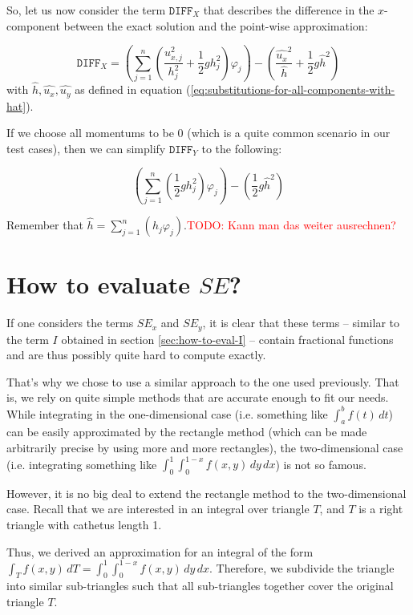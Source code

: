 \documentclass{article}
\newcommand{\todo}[1]{\textcolor{red}{TODO: #1}}
\renewcommand{\phi}{\varphi}
\begin{document}
So, let us now consider the term $\mathtt{DIFF}_X$ that describes the difference in the $x$-component between the exact solution and the point-wise approximation:

\begin{equation*}
  \mathtt{DIFF}_X = \left( \sum_{j=1}^n \left(\frac{u_{x,j}^2}{h_j^2} + \frac{1}{2} g h_j^2\right) \phi_j \right) - \left( \frac{\widehat{u_x}^2}{\widehat h} + \frac{1}{2} g \widehat{h}^2\right)
\end{equation*}
with $\widehat h, \widehat{u_x}, \widehat{u_y}$ as defined in equation (\ref{eq:substitutions-for-all-components-with-hat}).

If we choose all momentums to be 0 (which is a quite common scenario in our test cases), then we can simplify $\mathtt{DIFF}_Y$ to the following:

\begin{equation*}
  \left( \sum_{j=1}^n \left(\frac{1}{2} g h_j^2\right) \phi_j \right) - \left( \frac{1}{2} g \widehat{h}^2\right)
\end{equation*}

Remember that $\widehat{h}=\sum_{j=1}^n \left(h_j \phi_j\right)$.\todo{Kann man das weiter ausrechnen?}

\section{How to evaluate $SE$?}
\label{sec:how-to-evaluate-e}

If one considers the terms $SE_x$ and $SE_y$, it is clear that these terms -- similar to the term $I$ obtained in section \ref{sec:how-to-eval-I} -- contain fractional functions and are thus possibly quite hard to compute exactly.

That's why we chose to use a similar approach to the one used previously. That is, we rely on quite simple methods that are accurate enough to fit our needs. While integrating in the one-dimensional case (i.e. something like $\int_a^b f(t)\,dt$) can be easily approximated by the rectangle method (which can be made arbitrarily precise by using more and more rectangles), the two-dimensional case (i.e. integrating something like $\int_{0}^1 \int_0^{1-x} f(x,y)\, dy\, dx$) is not so famous.

However, it is no big deal to extend the rectangle method to the two-dimensional case. Recall that we are interested in an integral over triangle $T$, and $T$ is a right triangle with cathetus length 1.

Thus, we derived an approximation for an integral of the form $\int_T f(x,y)\, dT = \int_{0}^1 \int_0^{1-x} f(x,y)\, dy\, dx$. Therefore, we subdivide the triangle into similar sub-triangles such that all sub-triangles together cover the original triangle $T$. 
\end{document}
